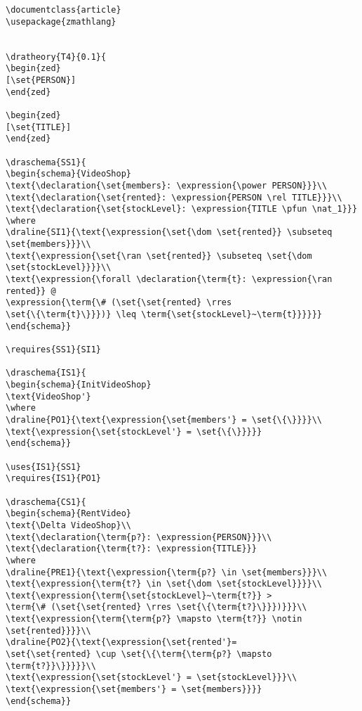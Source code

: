 \begin{verbatim}
\documentclass{article}
\usepackage{zmathlang}


\dratheory{T4}{0.1}{
\begin{zed}
[\set{PERSON}]
\end{zed}

\begin{zed}
[\set{TITLE}]
\end{zed}

\draschema{SS1}{
\begin{schema}{VideoShop}
\text{\declaration{\set{members}: \expression{\power PERSON}}}\\
\text{\declaration{\set{rented}: \expression{PERSON \rel TITLE}}}\\
\text{\declaration{\set{stockLevel}: \expression{TITLE \pfun \nat_1}}}
\where
\draline{SI1}{\text{\expression{\set{\dom \set{rented}} \subseteq \set{members}}}\\
\text{\expression{\set{\ran \set{rented}} \subseteq \set{\dom \set{stockLevel}}}}\\
\text{\expression{\forall \declaration{\term{t}: \expression{\ran rented}} @
\expression{\term{\# (\set{\set{rented} \rres 
\set{\{\term{t}\}}})} \leq \term{\set{stockLevel}~\term{t}}}}}}
\end{schema}}

\requires{SS1}{SI1}

\draschema{IS1}{
\begin{schema}{InitVideoShop}
\text{VideoShop'}
\where
\draline{PO1}{\text{\expression{\set{members'} = \set{\{\}}}}\\
\text{\expression{\set{stockLevel'} = \set{\{\}}}}}
\end{schema}}

\uses{IS1}{SS1}
\requires{IS1}{PO1}

\draschema{CS1}{
\begin{schema}{RentVideo}
\text{\Delta VideoShop}\\
\text{\declaration{\term{p?}: \expression{PERSON}}}\\
\text{\declaration{\term{t?}: \expression{TITLE}}}
\where
\draline{PRE1}{\text{\expression{\term{p?} \in \set{members}}}\\
\text{\expression{\term{t?} \in \set{\dom \set{stockLevel}}}}\\
\text{\expression{\term{\set{stockLevel}~\term{t?}} > 
\term{\# (\set{\set{rented} \rres \set{\{\term{t?}\}}})}}}\\
\text{\expression{\term{\term{p?} \mapsto \term{t?}} \notin \set{rented}}}}\\
\draline{PO2}{\text{\expression{\set{rented'}= 
\set{\set{rented} \cup \set{\{\term{\term{p?} \mapsto \term{t?}}\}}}}}\\
\text{\expression{\set{stockLevel'} = \set{stockLevel}}}\\
\text{\expression{\set{members'} = \set{members}}}}
\end{schema}}


\end{verbatim}
